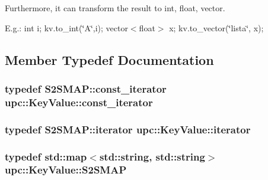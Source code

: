 Furthermore, it can transform the result to int, float, vector.

E.\+g.\+: int i; kv.\+to\+\_\+int(\char`\"{}\+A\char`\"{},i); vector$<$float$>$ x; kv.\+to\+\_\+vector(\char`\"{}lista\char`\"{}, x); 

\subsection{Member Typedef Documentation}
\subsubsection[{\texorpdfstring{const\+\_\+iterator}{const_iterator}}]{\setlength{\rightskip}{0pt plus 5cm}typedef S2\+S\+M\+A\+P\+::const\+\_\+iterator {\bf upc\+::\+Key\+Value\+::const\+\_\+iterator}\hspace{0.3cm}{\ttfamily [private]}}\hypertarget{classupc_1_1KeyValue_a1979eeaeda79e31e99fc6dc75b971373}{}\label{classupc_1_1KeyValue_a1979eeaeda79e31e99fc6dc75b971373}
\subsubsection[{\texorpdfstring{iterator}{iterator}}]{\setlength{\rightskip}{0pt plus 5cm}typedef S2\+S\+M\+A\+P\+::iterator {\bf upc\+::\+Key\+Value\+::iterator}\hspace{0.3cm}{\ttfamily [private]}}\hypertarget{classupc_1_1KeyValue_a3c6dedd86b7be8eadf7334b08d97364c}{}\label{classupc_1_1KeyValue_a3c6dedd86b7be8eadf7334b08d97364c}
\subsubsection[{\texorpdfstring{S2\+S\+M\+AP}{S2SMAP}}]{\setlength{\rightskip}{0pt plus 5cm}typedef std\+::map$<$std\+::string, std\+::string$>$ {\bf upc\+::\+Key\+Value\+::\+S2\+S\+M\+AP}\hspace{0.3cm}{\ttfamily [private]}}\hypertarget{classupc_1_1KeyValue_a7f07bc656bce50d056f5ad0d118b2562}{}\label{classupc_1_1KeyValue_a7f07bc656bce50d056f5ad0d118b2562}


